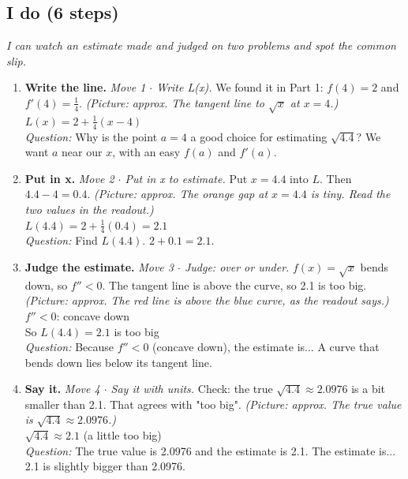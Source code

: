 \documentclass[11pt]{article}
\begin{document}
\subsection*{I do (6 steps)}
\textit{I can watch an estimate made and judged on two problems and spot the common slip.}\par
\begin{enumerate}
\item \textbf{Write the line.} \textit{Move 1 $\cdot$ Write L(x).} We found it in Part 1: $f(4)=2$ and $f'(4)=\tfrac14$. \textit{(Picture: approx. The tangent line to $\sqrt{x}$ at $x=4$.)}\\ $L(x)=2+\tfrac14(x-4)$\\ \textit{Question:} Why is the point $a=4$ a good choice for estimating $\sqrt{4.4}$?  We want $a$ near our $x$, with an easy $f(a)$ and $f'(a)$.
\item \textbf{Put in x.} \textit{Move 2 $\cdot$ Put in x to estimate.} Put $x=4.4$ into $L$. Then $4.4-4=0.4$. \textit{(Picture: approx. The orange gap at $x=4.4$ is tiny. Read the two values in the readout.)}\\ $L(4.4)=2+\tfrac14(0.4)=2.1$\\ \textit{Question:} Find $L(4.4)$.  $2+0.1=2.1$.
\item \textbf{Judge the estimate.} \textit{Move 3 $\cdot$ Judge: over or under.} $f(x)=\sqrt{x}$ bends down, so $f''<0$. The tangent line is above the curve, so 2.1 is too big. \textit{(Picture: approx. The red line is above the blue curve, as the readout says.)}\\ $f''<0$: concave down\\ So $L(4.4)=2.1$ is too big\\ \textit{Question:} Because $f''<0$ (concave down), the estimate is...  A curve that bends down lies below its tangent line.
\item \textbf{Say it.} \textit{Move 4 $\cdot$ Say it with units.} Check: the true $\sqrt{4.4}\approx2.0976$ is a bit smaller than 2.1. That agrees with "too big". \textit{(Picture: approx. The true value is $\sqrt{4.4}\approx2.0976$.)}\\ $\sqrt{4.4}\approx2.1$ (a little too big)\\ \textit{Question:} The true value is 2.0976 and the estimate is 2.1. The estimate is...  2.1 is slightly bigger than 2.0976.

\end{enumerate}
\end{document}
